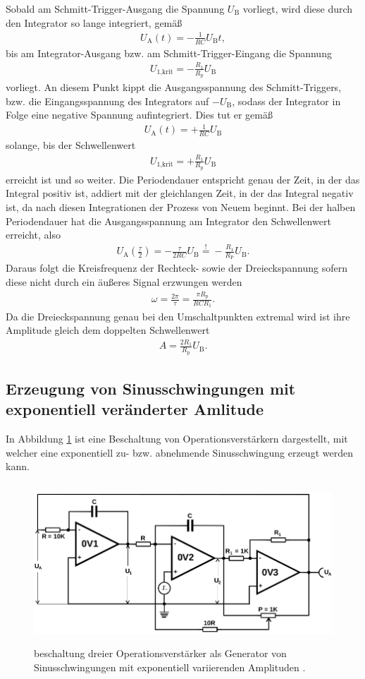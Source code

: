 Sobald am Schmitt-Trigger-Ausgang die Spannung $U_\text{B}$ vorliegt, wird diese
durch den Integrator so lange integriert, gemäß
\begin{align}
  U_\text{A}(t) = -\frac1{RC} U_\text{B} t,
\end{align}
bis am Integrator-Ausgang bzw. am Schmitt-Trigger-Eingang die Spannung
\begin{align}
  U_\text{1,krit} = - \frac{R_1}{R_\text{p}} U_\text{B}
\end{align}
vorliegt. An diesem Punkt kippt die Ausgangsspannung des Schmitt-Triggers, bzw. die Eingangsspannung
des Integrators auf $-U_\text{B}$, sodass der Integrator in Folge eine negative Spannung
aufintegriert. Dies tut er gemäß
\begin{align}
  U_\text{A}(t) = + \frac1{RC} U_\text{B}
\end{align}
solange, bis der Schwellenwert
\begin{align}
  U_\text{1,krit} = + \frac{R_1}{R_\text{p}} U_\text{B}
\end{align}
erreicht ist und so weiter. Die Periodendauer entspricht genau der Zeit, in der das Integral positiv ist, addiert mit
der gleichlangen Zeit, in der das Integral negativ ist, da nach diesen Integrationen der Prozess von
Neuem beginnt. Bei der halben Periodendauer hat die Ausgangsspannung am Integrator den
Schwellenwert erreicht, also
\begin{align}
  U_\text{A}\left( \frac{\tau}{2} \right) = -\frac{\tau}{2RC} U_\text{B} \stackrel{!}{=} -\frac{R_1}{R_\text{P}} U_\text{B}.
\end{align}
Daraus folgt die Kreisfrequenz der Rechteck- sowie der Dreieckspannung sofern diese nicht durch ein
äußeres Signal erzwungen werden
\begin{align}
  \omega = \frac{2\pi}{\tau} = \frac{\pi R_\text{p}}{R C R_1}.
\end{align}
Da die Dreieckspannung genau bei den Umschaltpunkten extremal wird ist ihre Amplitude gleich dem
doppelten Schwellenwert
\begin{align}
  A = \frac{2 R_1}{R_\text{p}} U_\text{B}.
\end{align}

\subsection{Erzeugung von Sinusschwingungen mit exponentiell veränderter Amlitude}

In Abbildung \ref{fig:expsin} ist eine Beschaltung von Operationsverstärkern dargestellt, mit welcher
eine exponentiell zu- bzw. abnehmende Sinusschwingung erzeugt werden kann.

\begin{figure}
  \centering
  \includegraphics[height=6cm]{ImmerDieseNorweger/expsin.png}
  \caption{beschaltung dreier Operationsverstärker als Generator von Sinusschwingungen mit exponentiell
  variierenden Amplituden \cite{anleitung}.}
  \label{fig:expsin}
\end{figure}

